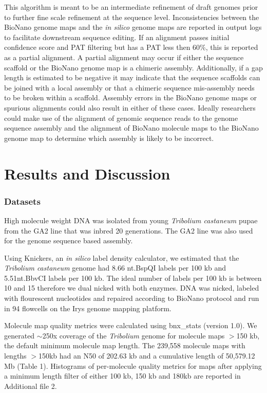 \documentclass{bmcart}
\begin{document}
This algorithm is meant to be an intermediate refinement of draft genomes prior to further fine scale refinement at the sequence level. Inconsistencies between the BioNano genome maps and the \textit{in silico} genome maps are reported in output logs to facilitate downstream sequence editing. If an alignment passes initial confidence score and PAT filtering but has a PAT less then 60\%, this is reported as a partial alignment. A partial alignment may occur if either the sequence scaffold or the BioNano genome map is a chimeric assembly. Additionally, if a gap length is estimated to be negative it may indicate that the sequence scaffolds can be joined with a local assembly or that a chimeric sequence mis-assembly needs to be broken within a scaffold. Assembly errors in the BioNano genome maps or spurious alignments could also result in either of these cases. Ideally researchers could make use of the alignment of genomic sequence reads to the genome sequence assembly and the alignment of BioNano molecule maps to the BioNano genome map to determine which assembly is likely to be incorrect.
 
\section*{Results and Discussion}

\subsubsection*{Datasets}
High molecule weight DNA was isolated from young \textit{Tribolium castaneum} pupae from the GA2 line that was inbred 20 generations. The GA2 line was also used for the genome sequence based assembly.

Using Knickers, an \textit{in silico} label density calculator, we estimated that the \textit{Tribolium castaneum} genome had 8.66 nt.BspQI labels per 100 kb and 5.51nt.BbvCI labels per 100 kb. The ideal number of labels per 100 kb is between 10 and 15 therefore we dual nicked with both enzymes. DNA was nicked, labeled with flourescent nucleotides and repaired according to BioNano protocol and run in 94 flowcells on the Irys genome mapping platform. 

Molecule map quality metrics were calculated using bnx\_stats (version 1.0). We generated $\sim$250x coverage of the \textit{Tribolium} genome for molecule maps $>$150 kb, the default minimum molecule map length. The 239,558 molecule maps with lengths $>$150kb had an N50 of 202.63 kb and a cumulative length of 50,579.12 Mb (Table 1). Histograms of per-molecule quality metrics for maps after applying a minimum length filter of either 100 kb, 150 kb and 180kb are reported in Additional file 2. 
\end{document}
